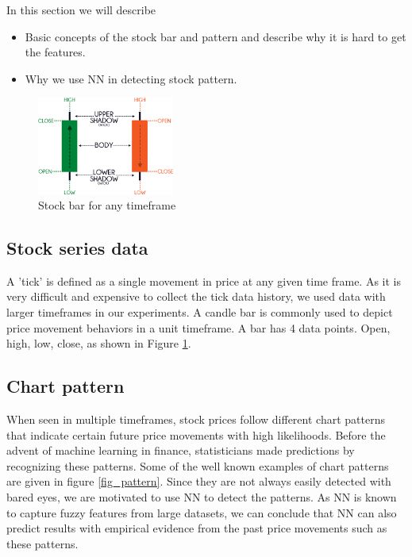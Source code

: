 

In this section we will describe 
\begin{itemize}
    \item Basic concepts of the stock bar and pattern and describe why it is hard to get the features.
    \item Why we use NN in detecting stock pattern. 
\end{itemize} 

\begin{figure}[htpb]
\begin{center}
\includegraphics[width=0.4\textwidth]{./figs/candlestick}
\vspace{-0.2cm}
\caption{Stock bar for any timeframe \cite{chartpattern}}
\label{fig_bar}
\end{center}
\vspace{-0.4cm}
\end{figure}

\subsection{Stock series data}
A 'tick' is defined as a single movement in price at any given time frame. As it is very difficult and expensive to collect the tick data history, we used data with larger timeframes in our experiments. A candle bar is commonly used to depict price movement behaviors in a unit timeframe. A bar has 4 data points. Open, high, low, close, as shown in Figure \ref{fig_bar}.

\subsection{Chart pattern}
When seen in multiple timeframes, stock prices follow different chart patterns that indicate certain future price movements with high likelihoods. Before the advent of machine learning in finance, statisticians made predictions by recognizing these patterns. Some of the well known examples of chart patterns are given in figure \ref{fig_pattern}. Since they are not always easily detected with bared eyes, we are motivated to use NN to detect the patterns. As NN is known to capture fuzzy features from large datasets, we can conclude that NN can also predict results with empirical evidence from the past price movements such as these patterns. 


